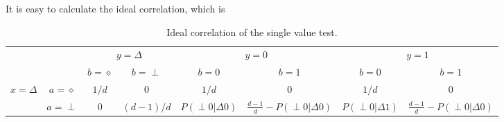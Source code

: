 \documentclass[11pt,letterpaper]{article}
\newcommand{\tri}{\Delta}
\newcommand{\1}{\mathbb{1}}
\newcommand{\pr}[2]{P(#1|#2)}
\theoremstyle{definition}
\begin{document}
It is easy to calculate the ideal correlation, which is
\begin{table}[H]
\begin{center}
\begin{tabular}{|c|c||c|c|c|c|c|c|}
\hline
\multicolumn{2}{|c|}{} &
\multicolumn{2}{|c|}{$y=\tri$} &
\multicolumn{2}{|c|}{$y=0$} &
\multicolumn{2}{|c|}{$y=1$}\\
\cline{3-8}
\multicolumn{2}{|c|}{} &$b = \diamond$ & $b = \perp$ & $b = 0$ & $b = 1$ & $b = 0$ & $b = 1$\\
\hline
\hline
\multirow{2}{*}{$x = \tri$} & $a=\diamond$ & $1/d$ & 0 & $1/d$ & 0 & $1/d$ & 0 \\
\cline{2-8}
&$a=\perp$ & 0 & $(d-1)/d$ & \small $\pr{\perp0}{\tri0}$ & \small $\frac{d-1}{d} -\pr{\perp0}{\tri0}$  
& \small $\pr{\perp0}{\tri1}$ & \small $\frac{d-1}{d}- \pr{\perp0}{\tri0}$  \\
\hline
\end{tabular}
\caption{Ideal correlation of the single value test.}
\end{center}
\end{table}
\end{document}
